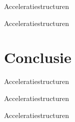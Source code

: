 \documentclass[11pt,t]{beamer}
\begin{document}
\begin{frame}{Acceleratiestructuren}
\end{frame}

\begin{frame}{Acceleratiestructuren}
\end{frame}

\section{Conclusie}

\begin{frame}{Acceleratiestructuren}
\end{frame}

\begin{frame}{Acceleratiestructuren}
\end{frame}

\begin{frame}{Acceleratiestructuren}
\end{frame}
\end{document}
